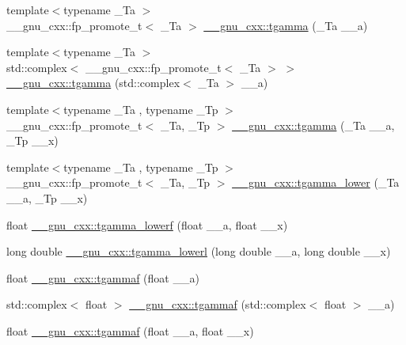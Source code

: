 \begin{DoxyCompactItemize}
\item 
{\footnotesize template$<$typename \+\_\+\+Ta $>$ }\\\+\_\+\+\_\+gnu\+\_\+cxx\+::fp\+\_\+promote\+\_\+t$<$ \+\_\+\+Ta $>$ \hyperlink{group__mathsf__gnu_ga73a634663e4eceb1e6bcf3fc16773b7b}{\+\_\+\+\_\+gnu\+\_\+cxx\+::tgamma} (\+\_\+\+Ta \+\_\+\+\_\+a)
\item 
{\footnotesize template$<$typename \+\_\+\+Ta $>$ }\\std\+::complex$<$ \+\_\+\+\_\+gnu\+\_\+cxx\+::fp\+\_\+promote\+\_\+t$<$ \+\_\+\+Ta $>$ $>$ \hyperlink{group__mathsf__gnu_gab01fe5b7f1bacdafcad5746ef50af777}{\+\_\+\+\_\+gnu\+\_\+cxx\+::tgamma} (std\+::complex$<$ \+\_\+\+Ta $>$ \+\_\+\+\_\+a)
\item 
{\footnotesize template$<$typename \+\_\+\+Ta , typename \+\_\+\+Tp $>$ }\\\+\_\+\+\_\+gnu\+\_\+cxx\+::fp\+\_\+promote\+\_\+t$<$ \+\_\+\+Ta, \+\_\+\+Tp $>$ \hyperlink{group__mathsf__gnu_ga264207c0040cd3877fad455121da8518}{\+\_\+\+\_\+gnu\+\_\+cxx\+::tgamma} (\+\_\+\+Ta \+\_\+\+\_\+a, \+\_\+\+Tp \+\_\+\+\_\+x)
\item 
{\footnotesize template$<$typename \+\_\+\+Ta , typename \+\_\+\+Tp $>$ }\\\+\_\+\+\_\+gnu\+\_\+cxx\+::fp\+\_\+promote\+\_\+t$<$ \+\_\+\+Ta, \+\_\+\+Tp $>$ \hyperlink{group__mathsf__gnu_gaed107908dec8865ea48e7764f7ea88a2}{\+\_\+\+\_\+gnu\+\_\+cxx\+::tgamma\+\_\+lower} (\+\_\+\+Ta \+\_\+\+\_\+a, \+\_\+\+Tp \+\_\+\+\_\+x)
\item 
float \hyperlink{group__mathsf__gnu_ga8f2aabeaa29d21b19c43972efb26798c}{\+\_\+\+\_\+gnu\+\_\+cxx\+::tgamma\+\_\+lowerf} (float \+\_\+\+\_\+a, float \+\_\+\+\_\+x)
\item 
long double \hyperlink{group__mathsf__gnu_gad057fe49a5bf95b1550f5f0a6e60bb19}{\+\_\+\+\_\+gnu\+\_\+cxx\+::tgamma\+\_\+lowerl} (long double \+\_\+\+\_\+a, long double \+\_\+\+\_\+x)
\item 
float \hyperlink{group__mathsf__gnu_ga008b1f4cc3a54c9c8221ad1f3504b593}{\+\_\+\+\_\+gnu\+\_\+cxx\+::tgammaf} (float \+\_\+\+\_\+a)
\item 
std\+::complex$<$ float $>$ \hyperlink{group__mathsf__gnu_gaf548b80db1501cbc067de1564e721972}{\+\_\+\+\_\+gnu\+\_\+cxx\+::tgammaf} (std\+::complex$<$ float $>$ \+\_\+\+\_\+a)
\item 
float \hyperlink{group__mathsf__gnu_ga942773871e9c21a50cf13ec160e7e8d9}{\+\_\+\+\_\+gnu\+\_\+cxx\+::tgammaf} (float \+\_\+\+\_\+a, float \+\_\+\+\_\+x)
\item 

\end{DoxyCompactItemize}
